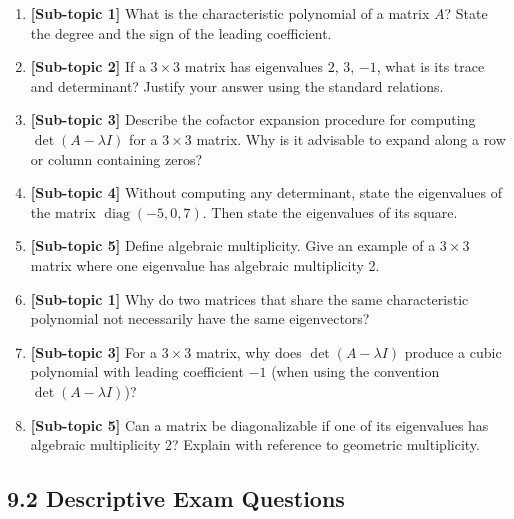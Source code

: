 \documentclass[12pt,a4paper]{article}
\begin{document}
\begin{enumerate}[leftmargin=*, label=\textbf{Q\arabic*.}]
  \item \textbf{[Sub-topic 1]} What is the characteristic polynomial of a matrix $A$? State the degree and the sign of the leading coefficient.
  \item \textbf{[Sub-topic 2]} If a $3\times3$ matrix has eigenvalues $2$, $3$, $-1$, what is its trace and determinant? Justify your answer using the standard relations.
  \item \textbf{[Sub-topic 3]} Describe the cofactor expansion procedure for computing $\det(A-\lambda I)$ for a $3\times3$ matrix. Why is it advisable to expand along a row or column containing zeros?
  \item \textbf{[Sub-topic 4]} Without computing any determinant, state the eigenvalues of the matrix $\operatorname{diag}(-5, 0, 7)$. Then state the eigenvalues of its square.
  \item \textbf{[Sub-topic 5]} Define algebraic multiplicity. Give an example of a $3\times3$ matrix where one eigenvalue has algebraic multiplicity 2.
  \item \textbf{[Sub-topic 1]} Why do two matrices that share the same characteristic polynomial not necessarily have the same eigenvectors?
  \item \textbf{[Sub-topic 3]} For a $3\times3$ matrix, why does $\det(A-\lambda I)$ produce a cubic polynomial with leading coefficient $-1$ (when using the convention $\det(A-\lambda I)$)?
  \item \textbf{[Sub-topic 5]} Can a matrix be diagonalizable if one of its eigenvalues has algebraic multiplicity $2$? Explain with reference to geometric multiplicity.
\end{enumerate}

\subsection*{9.2 Descriptive Exam Questions}
\end{document}
